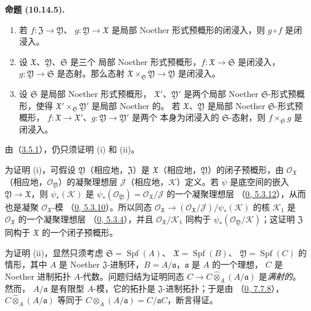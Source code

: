 \documentclass[UTF8,fontset=none,11pt,oneside,openany]{ctexbook}
\newenvironment{proposition}[1][]{%
  \par\medskip\noindent\textbf{命题 (#1).}\ %
}{\par}
\newcommand{\oldpage}[2][]{%
  \hypertarget{ega-source-page-#1-#2}{}%
  \marginnote{\scriptsize\textbf{#1}~|~#2}\ignorespaces}
\let\EGAOriginalLabel\label
\renewcommand{\label}[1]{\phantomsection\EGAOriginalLabel{#1}}
\begin{document}
\begin{proposition}[10.14.5]
\label{I.10.14.5-fr}
\begin{enumerate}
  \item[\rm{(i)}] 若 $f:\mathfrak{Z}\to\mathfrak{Y}$、
  $g:\mathfrak{Y}\to\mathfrak{X}$ 是局部 Noether 形式预概形的闭浸入，则
  $g\circ f$ 是闭浸入。

\oldpage[I]{211}
  \item[\rm{(ii)}] 设 $\mathfrak{X}$、$\mathfrak{Y}$、$\mathfrak{S}$ 是三个
  局部 Noether 形式预概形，$f:\mathfrak{X}\to\mathfrak{S}$ 是闭浸入，
  $g:\mathfrak{Y}\to\mathfrak{S}$ 是态射。那么态射
  $\mathfrak{X}\times_{\mathfrak{S}}\mathfrak{Y}\to\mathfrak{Y}$ 是闭浸入。
  \item[\rm{(iii)}] 设 $\mathfrak{S}$ 是局部 Noether 形式预概形，
  $\mathfrak{X}'$、$\mathfrak{Y}'$ 是两个局部 Noether
  $\mathfrak{S}$-形式预概形，使得
  $\mathfrak{X}'\times_{\mathfrak{S}}\mathfrak{Y}'$ 是局部 Noether 的。
  若 $\mathfrak{X}$、$\mathfrak{Y}$ 是局部 Noether
  $\mathfrak{S}$-形式预概形，
  $f:\mathfrak{X}\to\mathfrak{X}'$、$g:\mathfrak{Y}\to\mathfrak{Y}'$ 是两个
  本身为闭浸入的 $\mathfrak{S}$-态射，则
  $f\times_{\mathfrak{S}}g$ 是闭浸入。
\end{enumerate}
\end{proposition}

由（\hyperref[I.3.5.1-fr]{3.5.1}），仍只须证明 (i) 和 (ii)。

为证明 (i)，可假设 $\mathfrak{Y}$（相应地，$\mathfrak{Z}$）是
$\mathfrak{X}$（相应地，$\mathfrak{Y}$）的闭子预概形，由
$\mathscr{O}_{\mathfrak{X}}$（相应地，$\mathscr{O}_{\mathfrak{Y}}$）的凝聚理想层
$\mathscr{J}$（相应地，$\mathscr{K}$）定义。若 $\psi$ 是底空间的嵌入
$\mathfrak{Y}\to\mathfrak{X}$，则 $\psi_*(\mathscr{K})$ 是
$\psi_*(\mathscr{O}_{\mathfrak{Y}})
=\mathscr{O}_{\mathfrak{X}}/\mathscr{J}$ 的一个凝聚理想层
（\hyperref[0.5.3.12-fr]{0, 5.3.12}），从而也是凝聚
$\mathscr{O}_{\mathfrak{X}}$-模
（\hyperref[0.5.3.10-fr]{0, 5.3.10}）。所以同态
$\mathscr{O}_{\mathfrak{X}}\to
(\mathscr{O}_{\mathfrak{X}}/\mathscr{J})/\psi_*(\mathscr{K})$ 的核
$\mathscr{K}_1$ 是 $\mathscr{O}_{\mathfrak{X}}$ 的一个凝聚理想层
（\hyperref[0.5.3.4-fr]{0, 5.3.4}），并且
$\mathscr{O}_{\mathfrak{X}}/\mathscr{K}_1$ 同构于
$\psi_*(\mathscr{O}_{\mathfrak{Y}}/\mathscr{K})$；这证明
$\mathfrak{Z}$ 同构于 $\mathfrak{X}$ 的一个闭子预概形。

为证明 (ii)，显然只须考虑
$\mathfrak{S}=\operatorname{Spf}(A)$、
$\mathfrak{X}=\operatorname{Spf}(B)$、
$\mathfrak{Y}=\operatorname{Spf}(C)$ 的情形，其中 $A$ 是 Noether
$\mathfrak{J}$-进制环，$B=A/\mathfrak{a}$，$\mathfrak{a}$ 是 $A$ 的一个理想，
$C$ 是 Noether 进制拓扑 $A$-代数。问题归结为证明同态
$C\to C\widehat{\otimes}_A(A/\mathfrak{a})$ 是\emph{满射的}。然而，
$A/\mathfrak{a}$ 是有限型 $A$-模，它的拓扑是
$\mathfrak{J}$-进制拓扑；于是由
（\hyperref[0.7.7.8-fr]{0, 7.7.8}），
$C\widehat{\otimes}_A(A/\mathfrak{a})$ 等同于
$C\otimes_A(A/\mathfrak{a})=C/\mathfrak{a}C$，断言得证。
\end{document}
